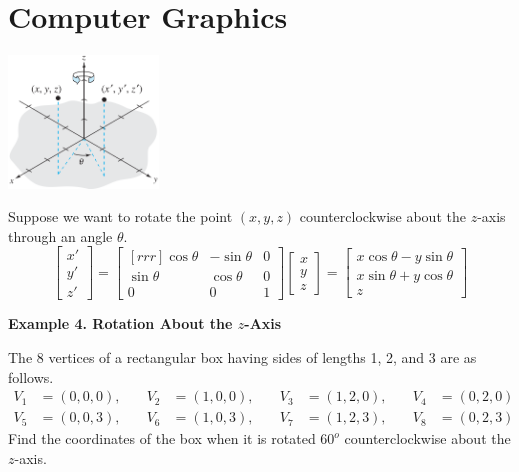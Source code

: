 \documentclass{article}
\begin{document}
    \section{Computer Graphics}
    
    \begin{minipage}{0.3\linewidth}
        \includegraphics[width = 4cm]{images/rotatez3d.png}
    \end{minipage}
    \begin{minipage}{0.63\linewidth}
        Suppose we want to rotate the point $(x,y,z)$ counterclockwise about the $z$-axis through an angle $\theta$.
        \[ \begin{bmatrix}
            x' \\ y' \\ z'
        \end{bmatrix} = 
        \begin{bmatrix}[rrr]
            \cos{ \theta} & - \sin{ \theta } & 0 \\
            \sin{ \theta } & \cos{ \theta } & 0 \\
            0 & 0 & 1
        \end{bmatrix} \begin{bmatrix}
            x \\ y \\ z
        \end{bmatrix} = 
        \begin{bmatrix}
            x \cos{ \theta } - y \sin{ \theta } \\
            x \sin{ \theta } + y \cos{ \theta } \\
            z
        \end{bmatrix}\]
    \end{minipage}

    \textbf{Example 4. \textcolor{blue5}{Rotation About the $z$-Axis}}

    The 8 vertices of a rectangular box having sides of lengths 1, 2, and 3 are as follows.
    \begin{align*}
        V_1 &= (0,0,0), \quad & V_2 &= (1,0,0), \quad & V_3 &= (1,2,0), \quad & V_4 &= (0,2,0) \\
        V_5 &= (0,0,3), \quad & V_6 &= (1,0,3), \quad & V_7 &= (1,2,3), \quad & V_8 &= (0,2,3)
    \end{align*}
    Find the coordinates of the box when it is rotated $60^o$ counterclockwise about the $z$-axis.
    
\end{document}
